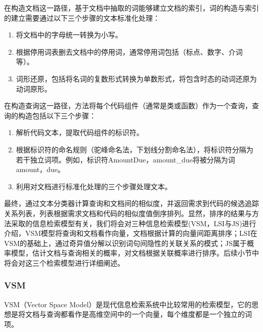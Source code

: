 在构造文档这一路径，基于文档中抽取的词能够建立文档的索引，词的构造与索引的建立需要通过以下三个步骤的文本标准化处理：
\begin{enumerate}
  \item 将文档中的字母统一转换为小写。

  \item 根据停用词表删去文档中的停用词，通常停用词包括（标点、数字、介词等）。

  \item 词形还原，包括将名词的复数形式转换为单数形式，将包含时态的动词还原为动词原形。
\end{enumerate}
在构造查询这一路径，方法将每个代码组件（通常是类或函数）作为一个查询，查询的构造包括以下三个步骤：
\begin{enumerate}
  \item 解析代码文本，提取代码组件的标识符。

  \item 根据标识符的命名规则（驼峰命名法，下划线分割命名法），将标识符分隔为若干独立词项。例如，标识符AmountDue，amount\_due将被分隔为词amount，due。

  \item 利用对文档进行标准化处理的三个步骤处理文本。
\end{enumerate}
最终，通过文本分类器计算查询和文档间的相似度，并返回需求到代码的候选追踪关系列表，列表根据需求文档和代码的相似度值倒序排列。显然，排序的结果与方法采取的信息检索模型有关，我们将会对三种信息检索模型(VSM，LSI与JS)进行介绍，VSM模型将查询和文档看作向量，文档根据计算的向量间距离排序；LSI在VSM的基础上，通过奇异值分解以识别词句间隐性的关联关系的模式；JS属于概率模型，估计文档与查询相关的概率，对文档根据关联概率进行排序。后续小节中将会对这三个检索模型进行详细阐述。

\subsubsection{VSM}
VSM（Vector Space Model）是现代信息检索系统中比较常用的检索模型，它的思想是将文档与查询都看作是高维空间中的一个向量，每个维度都是一个独立的词项。

